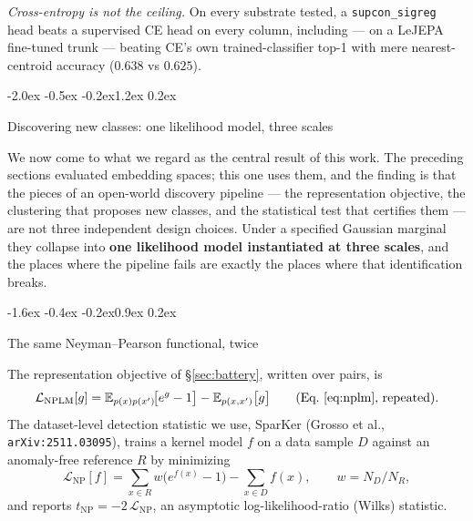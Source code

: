 \documentclass{article}
\makeatletter
\renewcommand\section{\@startsection{section}{1}{\z@}%
  {-2.0ex \@plus -0.5ex \@minus -0.2ex}{1.2ex \@plus 0.2ex}%
  {\large\bf\raggedright}}
\renewcommand\subsection{\@startsection{subsection}{2}{\z@}%
  {-1.6ex \@plus -0.4ex \@minus -0.2ex}{0.9ex \@plus 0.2ex}%
  {\normalsize\bf\raggedright}}
\newcommand{\E}{\mathbb{E}}
\makeatother
\begin{document}
\emph{Cross-entropy is not the ceiling.} On every substrate tested, a
\texttt{supcon\_sigreg} head beats a supervised CE head on every column,
including --- on a LeJEPA fine-tuned trunk --- beating CE's own trained-classifier
top-1 with mere nearest-centroid accuracy ($0.638$ vs $0.625$).

\section{Discovering new classes: one likelihood model, three scales}
\label{sec:discovery}

We now come to what we regard as the central result of this work. The
preceding sections evaluated embedding spaces; this one uses them, and the
finding is that the pieces of an open-world discovery pipeline --- the
representation objective, the clustering that proposes new classes, and the
statistical test that certifies them --- are not three independent design
choices. Under a specified Gaussian marginal they collapse into
\textbf{one likelihood model instantiated at three scales}, and the places
where the pipeline fails are exactly the places where that identification
breaks.

\subsection{The same Neyman--Pearson functional, twice}
\label{sec:np-twice}

The representation objective of \S\ref{sec:battery}, written over pairs, is
\begin{equation}
\mathcal{L}_{\mathrm{NPLM}}[g]
= \E_{p(x)p(x')}\!\big[e^{g}-1\big] - \E_{p(x,x')}\big[g\big]
\qquad\text{(Eq.~\ref{eq:nplm}, repeated).}
\label{eq:nplm-again}
\end{equation}
The dataset-level detection statistic we use, SparKer
(Grosso et al., \texttt{arXiv:2511.03095}), trains a kernel model $f$ on a
data sample $D$ against an anomaly-free reference $R$ by minimizing
\begin{equation}
\mathcal{L}_{\mathrm{NP}}[f]
= \sum_{x\in R} w\big(e^{f(x)}-1\big) - \sum_{x\in D} f(x),
\qquad w = N_D/N_R ,
\label{eq:sparker}
\end{equation}
and reports $t_{\mathrm{NP}} = -2\,\mathcal{L}_{\mathrm{NP}}$, an asymptotic
log-likelihood-ratio (Wilks) statistic.
\end{document}
